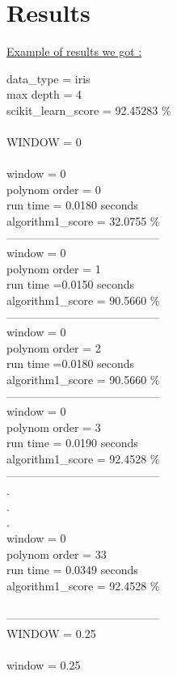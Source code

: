 \documentclass{article}
\begin{document}
\section{Results}
\underline{\large{Example of results we got :}}
\begin{multicols}{2}
data\_type = iris\\
max depth = 4\\
scikit\_learn\_score = 92.45283 \% \\\\
WINDOW = 0 \\\\
window = 0\\
polynom order = 0\\
run time = 0.0180 seconds\\
algorithm1\_score = 32.0755 \%\\
-----------------------------------------\\
window = 0\\
polynom order = 1\\
run time =0.0150 seconds\\
algorithm1\_score = 90.5660 \%\\
-----------------------------------------\\
window = 0\\
polynom order = 2\\
run time =0.0180 seconds\\
algorithm1\_score = 90.5660 \%\\
-----------------------------------------\\
window = 0 \\
polynom order = 3\\
run time = 0.0190 seconds\\
algorithm1\_score = 92.4528 \%\\
-----------------------------------------\\
.\\
.\\
.\\
window = 0\\
polynom order = 33\\
run time = 0.0349 seconds\\
algorithm1\_score = 92.4528 \% \\\\
-----------------------------------------\\
WINDOW = 0.25\\\\
window = 0.25\\

\end{multicols}
\end{document}
